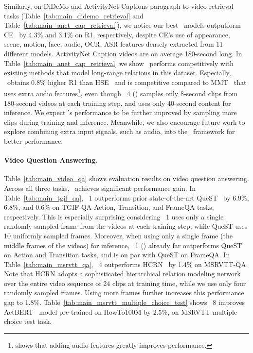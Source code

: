 Similarly, on DiDeMo and ActivityNet Captions paragraph-to-video retrieval tasks (Table~\ref{tab:main_didemo_retrieval} and Table~\ref{tab:main_anet_cap_retrieval}), we notice our best \ModelName~models outputform CE~\cite{liu2019use} by 4.3\% and 3.1\% on R1, respectively, despite CE's use of appearance, scene, motion, face, audio, OCR, ASR features densely extracted from 11 different models.
ActivityNet Caption videos are on average 180-second long. 
In Table~\ref{tab:main_anet_cap_retrieval} we show \ModelName~performs competitively with existing methods that model long-range relations in this dataset. 
Especially, \ModelName~obtains 0.8\% higher R1 than HSE~\cite{zhang2018cross} and is competitive compared to MMT~\cite{gabeur2020multi} that uses extra audio features\footnote{\cite{gabeur2020multi} shows that adding audio features greatly improves performance.}, even though \ModelName~4 () samples only 8-second clips from 180-second videos at each training step, and uses only 40-second content for inference.
We expect \ModelName's performance to be further improved by sampling more clips during training and inference.
Meanwhile, we also encourage future work to explore combining extra input signals, such as audio, into the \ModelName~framework for better performance.

\paragraph{Video Question Answering.}
Table~\ref{tab:main_video_qa} shows evaluation results on video question answering. 
Across all three tasks, \ModelName~achieves significant performance gain.
In Table~\ref{tab:main_tgif_qa}, \ModelName~1 outperforms prior state-of-the-art QueST~\cite{jiang2020divide} by 6.9\%, 6.8\%, and 0.6\% on TGIF-QA Action, Transition, and FrameQA tasks, respectively.
This is especially surprising considering \ModelName~1 uses only a single randomly sampled frame from the videos at each training step, while QueST uses 10 uniformly sampled frames.
Moreover, when using only a single frame (the middle frames of the videos) for inference, \ModelName~1 () already far outperforms QueST on Action and Transition tasks, and is on par with QueST on FrameQA.
In Table~\ref{tab:main_msrvtt_qa}, \ModelName~4 outperforms HCRN~\cite{le2020hierarchical} by 1.4\% on MSRVTT-QA.
Note that HCRN adopts a sophisticated hierarchical relation modeling network over the entire video sequence of 24 clips at training time, while we use only four randomly sampled frames. 
Using more frames further increases this performance gap to 1.8\%.
Table~\ref{tab:main_msrvtt_multiple_choice_test} shows \ModelName~8 improves ActBERT~\cite{zhu2020actbert} model pre-trained on HowTo100M by 2.5\%, on MSRVTT multiple choice test task.
